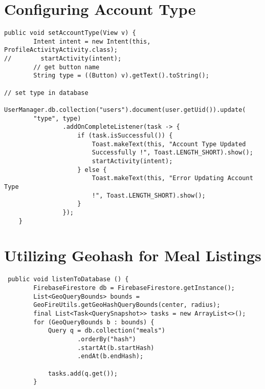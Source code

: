 \section{Configuring Account Type}
\begin{verbatim}
public void setAccountType(View v) {
        Intent intent = new Intent(this, ProfileActivityActivity.class);
//        startActivity(intent);
        // get button name
        String type = ((Button) v).getText().toString();

// set type in database
        UserManager.db.collection("users").document(user.getUid()).update(
        "type", type)
                .addOnCompleteListener(task -> {
                    if (task.isSuccessful()) {
                        Toast.makeText(this, "Account Type Updated 
                        Successfully !", Toast.LENGTH_SHORT).show();
                        startActivity(intent);
                    } else {
                        Toast.makeText(this, "Error Updating Account Type 
                        !", Toast.LENGTH_SHORT).show();
                    }
                });
    }
\end{verbatim}
\section{Utilizing Geohash for Meal Listings}
\begin{verbatim}
 public void listenToDatabase () {
        FirebaseFirestore db = FirebaseFirestore.getInstance();
        List<GeoQueryBounds> bounds = 
        GeoFireUtils.getGeoHashQueryBounds(center, radius);
        final List<Task<QuerySnapshot>> tasks = new ArrayList<>();
        for (GeoQueryBounds b : bounds) {
            Query q = db.collection("meals")
                    .orderBy("hash")
                    .startAt(b.startHash)
                    .endAt(b.endHash);

            tasks.add(q.get());
        }
\end{verbatim}

